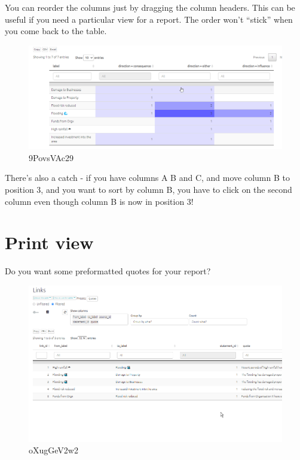 \documentclass[
]{book}
\begin{document}
You can reorder the columns just by dragging the column headers. This can be useful if you need a particular view for a report. The order won't ``stick'' when you come back to the table.

\begin{figure}
\centering
\includegraphics{_assets/9PovsVAc29.gif}
\caption{9PovsVAc29}
\end{figure}

There's also a catch - if you have columns A B and C, and move column B to position 3, and you want to sort by column B, you have to click on the second column even though column B is now in position 3!

\hypertarget{xprint-view-tables-old}{%
\section{Print view}\label{xprint-view-tables-old}}

Do you want some preformatted quotes for your report?

\begin{figure}
\centering
\includegraphics{_assets/oXugGeV2w2.gif}
\caption{oXugGeV2w2}
\end{figure}
\end{document}
